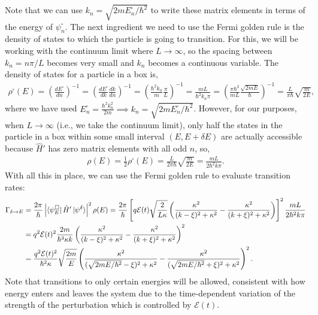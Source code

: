 \documentclass[10pt]{article}
\newcommand{\1}{\mathbf 1}
\begin{document}
Note that we can use $k_n = \sqrt{2m E_n^\square / \hbar^2}$ to write these matrix elements in terms of the energy of $\psi_n^\square$.
The next ingredient we need to use the Fermi golden rule is the density of states to which the particle is going to transition.
For this, we will be working with the continuum limit where $L \to \infty$, so the spacing between $k_n = n\pi/L$ becomes very small and $k_n$ becomes a continuous variable.
The density of states for a particle in a box is,
\begin{align}
	\rho^\square(E)
	=
	\left(\frac{d E^\square}{dn}\right)^{-1}
	=
	\left(\frac{d E^\square}{dk}
	\frac{dk}{dn}\right)^{-1}
	=
	\left(
		\frac{\hbar^2 k_n}{m}
		\frac{\pi}{L}
	\right)^{-1}
	=
	\frac{m L}{\hbar^2 k_n \pi}
	=
	\left(
		\frac{\pi\hbar^2}{mL}\frac{\sqrt{2m E}}{\hbar}
	\right)^{-1}
	=
	\frac{L}{\pi \hbar}\sqrt{\frac{m}{2 E}}
	,
\end{align}
where we have used $E_n^\square = \frac{\hbar^2 k_n^2}{2m} \implies k_n = \sqrt{2m E_n^\square/\hbar^2}$.
However, for our purposes, when $L \to \infty$ (i.e., we take the continuum limit), only half the states in the particle in a box within some small interval $(E, E+\delta E)$ are actually accessible because $\hat H'$ has zero matrix elements with all odd $n$, so,
\begin{align}
	\rho(E)
	=
	\frac{1}{2}\rho^\square (E)
	=
	\frac{L}{2\pi\hbar}
	\sqrt{\frac{m}{2E}}
	=
	\frac{m L}{2\hbar^2 k \pi}
	.
\end{align}
With all this in place, we can use the Fermi golden rule to evaluate transition rates:
\begin{align}
	\Gamma_{\delta \to E}
	&=\nonumber
	\frac{2\pi}{\hbar}
	\left|
		\bra{\psi_E^\square} \hat H' \ket{\psi^\delta}
	\right|^2
	\rho(E)
	=
	\frac{2\pi}{\hbar}
	\left[
		q \mathcal{E}(t)
		\sqrt{\frac{2}{L\kappa}}
		\left(
			\frac{\kappa^2}{(k - \xi)^2 + \kappa^2}
			-
			\frac{\kappa^2}{(k + \xi)^2 + \kappa^2}
		\right)
	\right]^2
	\frac{m L}{2 \hbar^2 k \pi}
	\\
	&=
	q^2 \mathcal{E}(t)^2
	\frac{2m}{\hbar^3 \kappa k }
		\left(
			\frac{\kappa^2}{(k - \xi)^2 + \kappa^2}
			-
			\frac{\kappa^2}{(k + \xi)^2 + \kappa^2}
		\right)^2
		\\
	&=
	\frac{q^2 \mathcal{E}(t)^2}{\hbar^2 \kappa }
	\sqrt{\frac{2m}{E}}
		\left(
			\frac{\kappa^2}{(\sqrt{2m E/\hbar^2} - \xi)^2 + \kappa^2}
			-
			\frac{\kappa^2}{(\sqrt{2m E/\hbar^2} + \xi)^2 + \kappa^2}
		\right)^2.
\end{align}
Note that transitions to only certain energies will be allowed, consistent with how energy enters and leaves the system due to the time-dependent variation of the strength of the perturbation which is controlled by $\mathcal{E}(t)$.
\end{document}

